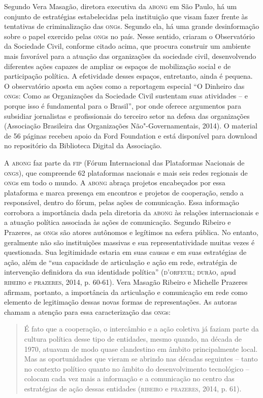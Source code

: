 Segundo Vera Masagão, diretora executiva da \textsc{abong} em São Paulo, há um
conjunto de estratégias estabelecidas pela instituição que visam fazer
frente às tentativas de criminalização das \textsc{ong}s. Segundo ela, há uma
grande desinformação sobre o papel exercido pelas \textsc{ong}s no país. Nesse
sentido, criaram o Observatório da Sociedade Civil, conforme citado
acima, que procura construir um ambiente mais favorável para a atuação
das organizações da sociedade civil, desenvolvendo diferentes ações
capazes de ampliar os espaços de mobilização social e de participação
política. A efetividade desses espaços, entretanto, ainda é pequena. O
observatório aposta em ações como a reportagem especial ``O Dinheiro das
\textsc{ong}s: Como as Organizações da Sociedade Civil sustentam suas atividades
-- e porque isso é fundamental para o Brasil'', por onde oferece
argumentos para subsidiar jornalistas e profissionais do terceiro setor
na defesa das organizações (Associação Brasileira das Organizações
Não"-Governamentais, 2014). O material de 56 páginas recebeu apoio da
Ford Foundation e está disponível para download no repositório da
Biblioteca Digital da Associação.

A \textsc{abong} faz parte da \textsc{fip} (Fórum Internacional das Plataformas Nacionais
de \textsc{ongs}), que compreende 62 plataformas nacionais e mais seis redes
regionais de \textsc{ong}s em todo o mundo. A \textsc{abong} abraça projetos encabeçados
por essa plataforma e marca presença em encontros e projetos de
cooperação, sendo a responsável, dentro do fórum, pelas ações de
comunicação. Essa informação corrobora a importância dada pela diretoria
da \textsc{abong} às relações internacionais e a atuação política associada às
ações de comunicação. Segundo Ribeiro e Prazeres, as \textsc{ong}s são atores
autônomos e legítimos na esfera pública. No entanto, geralmente não são
instituições massivas e sua representatividade muitas vezes é
questionada. Sua legitimidade estaria em suas causas e em suas
estratégias de ação, além de ``sua capacidade de articulação e ação em
rede, estratégia de intervenção definidora da sua identidade política''
(\textsc{d'orfeuil; durão}, apud \textsc{ribeiro} e \textsc{prazeres}, 2014, p. 60-61). Vera
Masagão Ribeiro e Michelle Prazeres afirmam, portanto, a importância da
articulação e comunicação em rede como elemento de legitimação dessas
novas formas de representações. As autoras chamam a atenção para essa
caracterização das \textsc{ong}s:

\begin{quote}
É fato que a cooperação, o intercâmbio e a ação coletiva já faziam parte
da cultura política desse tipo de entidades, mesmo quando, na década de
1970, atuavam de modo quase clandestino em âmbito principalmente local.
Mas as oportunidades que vieram se abrindo nas décadas seguintes --
tanto no contexto político quanto no âmbito do desenvolvimento
tecnológico -- colocam cada vez mais a informação e a comunicação no
centro das estratégias de ação dessas entidades (\textsc{ribeiro} e \textsc{prazeres},
2014, p. 61).
\end{quote}

